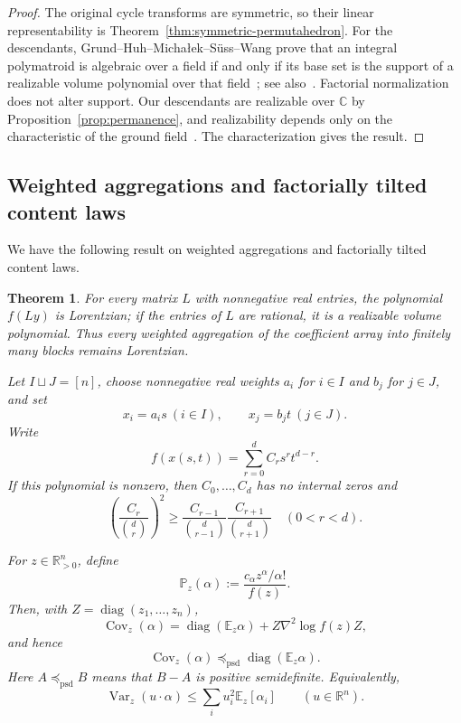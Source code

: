 \documentclass[11pt,a4paper,oneside]{amsart}
\numberwithin{equation}{section}
\newtheorem{theorem}{Theorem}[section]
\theoremstyle{definition}
\theoremstyle{remark}
\DeclareMathOperator{\diag}{diag}
\DeclareMathOperator{\Cov}{Cov}
\DeclareMathOperator{\Var}{Var}
\newcommand{\R}{\mathbb R}
\newcommand{\C}{\mathbb C}
\newcommand{\psd}{\preceq_{\mathrm{psd}}}
\begin{document}
\begin{proof}
The original cycle transforms are symmetric, so their linear representability is Theorem~\ref{thm:symmetric-permutahedron}.  For the descendants, Grund--Huh--Micha{\l}ek--S\"uss--Wang prove that an integral polymatroid is algebraic over a field if and only if its base set is the support of a realizable volume polynomial over that field~\cite[Proposition~5.4]{GHMSW25}; see also~\cite[Proposition~5.5]{HuhVolume26}.  Factorial normalization does not alter support.  Our descendants are realizable over $\C$ by Proposition~\ref{prop:permanence}, and realizability depends only on the characteristic of the ground field~\cite[Proposition~2.10]{GHMSW25}.  The characterization gives the result.
\end{proof}

\subsection{Weighted aggregations and factorially tilted content laws}

We have the following result on weighted aggregations and factorially tilted content laws.

\begin{theorem}\label{thm:block-covariance}
For every matrix $L$ with nonnegative real entries, the polynomial $f(Ly)$ is
Lorentzian; if the entries of $L$ are rational, it is a realizable volume
polynomial.  Thus every weighted aggregation of the coefficient array into
finitely many blocks remains Lorentzian.

Let $I\sqcup J=[n]$, choose nonnegative real weights $a_i$ for $i\in I$ and $b_j$ for $j\in J$, and set
\[
 x_i=a_i s\ (i\in I),
 \qquad
 x_j=b_j t\ (j\in J).
\]
Write
\begin{equation}\label{eq:block-g}
 f(x(s,t))=\sum_{r=0}^d C_r s^r t^{d-r}.
\end{equation}
If this polynomial is nonzero, then $C_0,\ldots,C_d$ has no internal zeros and
\begin{equation}\label{eq:block-ULC}
 \left(\frac{C_r}{\binom dr}\right)^2
 \geq
 \frac{C_{r-1}}{\binom d{r-1}}
 \frac{C_{r+1}}{\binom d{r+1}}
 \quad(0<r<d).
\end{equation}

For $z\in\R_{>0}^n$, define
\begin{equation}\label{eq:factorial-probability}
 \mathbb P_z(\alpha)
 :=\frac{c_\alpha z^\alpha/\alpha!}{f(z)}.
\end{equation}
Then, with $Z=\diag(z_1,\ldots,z_n)$,
\begin{equation}\label{eq:cov-identity-general}
 \Cov_z(\alpha)
 =\diag(\mathbb E_z\alpha)+Z\nabla^2\log f(z)Z,
\end{equation}
and hence
\begin{equation}\label{eq:cov-bound-general}
 \Cov_z(\alpha)\psd\diag(\mathbb E_z\alpha).
\end{equation}
Here $A\preceq_{\mathrm{psd}}B$ means that $B-A$ is positive semidefinite.
Equivalently,
\[
 \Var_z(u\cdot\alpha)
 \leq\sum_i u_i^2\mathbb E_z[\alpha_i]
 \qquad(u\in\R^n).
\]
\end{theorem}
\end{document}
